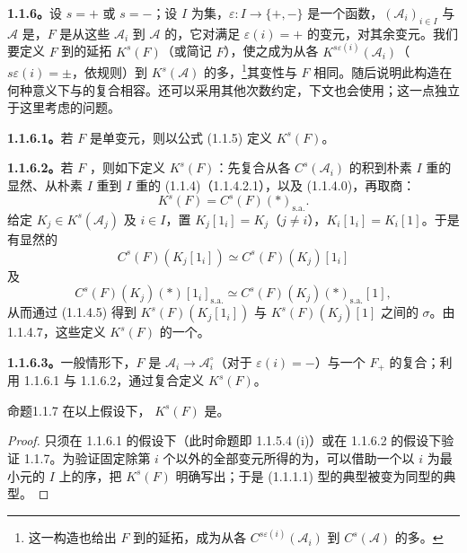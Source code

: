 \textbf{1.1.6。}设 $s=+$ 或 $s=-$；设 $I$ 为集，$\varepsilon:I\to\{+,-\}$ 是一个函数，$(\mathcal A_i)_{i\in I}$ 与 $\mathcal A$ 是，$F$ 是从这些 $\mathcal A_i$ 到 $\mathcal A$ 的，它对满足 $\varepsilon(i)=+$ 的变元，对其余变元。我们要定义 $F$ 到的延拓 $K^s(F)$（或简记 $F$），使之成为从各 $K^{s\varepsilon(i)}(\mathcal A_i)$（$s\varepsilon(i)=\pm$，依规则）到 $K^s(\mathcal A)$ 的多，\footnote{这一构造也给出 $F$ 到的延拓，成为从各 $C^{s\varepsilon(i)}(\mathcal A_i)$ 到 $C^s(\mathcal A)$ 的多。}其变性与 $F$ 相同。随后说明此构造在何种意义下与的复合相容。还可以采用其他次数约定，下文也会使用；这一点独立于这里考虑的问题。

\textbf{1.1.6.1。}若 $F$ 是单变元，则以公式 (1.1.5) 定义 $K^s(F)$。

\textbf{1.1.6.2。}若 $F$ ，则如下定义 $K^s(F)$：先复合从各 $C^s(\mathcal A_i)$ 的积到朴素 $I$ 重的显然、从朴素 $I$ 重到 $I$ 重的 (1.1.4)（1.1.4.2.1），以及 (1.1.4.0)，再取商：
\[
K^s(F)=C^s(F)(*)_{\mathrm{s.a.}}.
\]
给定 $K_j\in K^s(\mathcal A_j)$ 及 $i\in I$，置 $K_j[1_i]=K_j$（$j\ne i$），$K_i[1_i]=K_i[1]$。于是有显然的
\[
C^s(F)(K_j[1_i])\simeq C^s(F)(K_j)[1_i]
\]
及
\[
C^s(F)(K_j)(*)[1_i]_{\mathrm{s.a.}}\simeq C^s(F)(K_j)(*)_{\mathrm{s.a.}}[1],
\]
从而通过 (1.1.4.5) 得到 $K^s(F)(K_j[1_i])$ 与 $K^s(F)(K_j)[1]$ 之间的 $\sigma$。由 1.1.4.7，这些定义 $K^s(F)$ 的一个。

\textbf{1.1.6.3。}一般情形下，$F$ 是 $\mathcal A_i\to\mathcal A_i^\circ$（对于 $\varepsilon(i)=-$）与一个 $F_+$ 的复合；利用 1.1.6.1 与 1.1.6.2，通过复合定义 $K^s(F)$。

\begin{SGAresult}{命题}{1.1.7}
在以上假设下， $K^s(F)$ 是。
\end{SGAresult}
\begin{proof}
只须在 1.1.6.1 的假设下（此时命题即 1.1.5.4 (i)）或在 1.1.6.2 的假设下验证 1.1.7。为验证固定除第 $i$ 个以外的全部变元所得的为，可以借助一个以 $i$ 为最小元的 $I$ 上的序，把 $K^s(F)$ 明确写出；于是 (1.1.1.1) 型的典型被变为同型的典型。
\end{proof}


